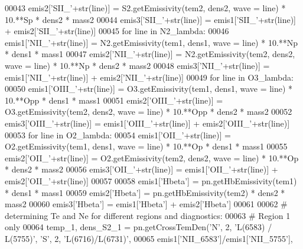 \begin{DoxyCode}
00043     emis2[\textcolor{stringliteral}{'SII\_'}+str(line)] = S2.getEmissivity(tem2, dens2, wave = line) * 10.**Sp * dens2 * mass2
00044     emis3[\textcolor{stringliteral}{'SII\_'}+str(line)] = emis1[\textcolor{stringliteral}{'SII\_'}+str(line)] + emis2[\textcolor{stringliteral}{'SII\_'}+str(line)]
00045 \textcolor{keywordflow}{for} line \textcolor{keywordflow}{in} N2\_lambda:
00046     emis1[\textcolor{stringliteral}{'NII\_'}+str(line)] = N2.getEmissivity(tem1, dens1, wave = line) * 10.**Np * dens1 * mass1
00047     emis2[\textcolor{stringliteral}{'NII\_'}+str(line)] = N2.getEmissivity(tem2, dens2, wave = line) * 10.**Np * dens2 * mass2
00048     emis3[\textcolor{stringliteral}{'NII\_'}+str(line)] = emis1[\textcolor{stringliteral}{'NII\_'}+str(line)] + emis2[\textcolor{stringliteral}{'NII\_'}+str(line)]
00049 \textcolor{keywordflow}{for} line \textcolor{keywordflow}{in} O3\_lambda:
00050     emis1[\textcolor{stringliteral}{'OIII\_'}+str(line)] = O3.getEmissivity(tem1, dens1, wave = line) * 10.**Opp * dens1 * mass1
00051     emis2[\textcolor{stringliteral}{'OIII\_'}+str(line)] = O3.getEmissivity(tem2, dens2, wave = line) * 10.**Opp * dens2 * mass2
00052     emis3[\textcolor{stringliteral}{'OIII\_'}+str(line)] = emis1[\textcolor{stringliteral}{'OIII\_'}+str(line)] + emis2[\textcolor{stringliteral}{'OIII\_'}+str(line)]
00053 \textcolor{keywordflow}{for} line \textcolor{keywordflow}{in} O2\_lambda:
00054     emis1[\textcolor{stringliteral}{'OII\_'}+str(line)] = O2.getEmissivity(tem1, dens1, wave = line) * 10.**Op * dens1 * mass1
00055     emis2[\textcolor{stringliteral}{'OII\_'}+str(line)] = O2.getEmissivity(tem2, dens2, wave = line) * 10.**Op * dens2 * mass2
00056     emis3[\textcolor{stringliteral}{'OII\_'}+str(line)] = emis1[\textcolor{stringliteral}{'OII\_'}+str(line)] + emis2[\textcolor{stringliteral}{'OII\_'}+str(line)]
00057         
00058 emis1[\textcolor{stringliteral}{'Hbeta'}] = pn.getHbEmissivity(tem1) * dens1 * mass1
00059 emis2[\textcolor{stringliteral}{'Hbeta'}] = pn.getHbEmissivity(tem2) * dens2 * mass2
00060 emis3[\textcolor{stringliteral}{'Hbeta'}] = emis1[\textcolor{stringliteral}{'Hbeta'}] + emis2[\textcolor{stringliteral}{'Hbeta'}] 
00061 
00062 \textcolor{comment}{# determining Te and Ne for different regions and diagnostics:}
00063 \textcolor{comment}{# Region 1 only}
00064 temp\_1, dens\_S2\_1 = pn.getCrossTemDen(\textcolor{stringliteral}{'N'}, 2, \textcolor{stringliteral}{'L(6583) / L(5755)'}, \textcolor{stringliteral}{'S'}, 2, \textcolor{stringliteral}{'L(6716)/L(6731)'}, 
00065                                       emis1[\textcolor{stringliteral}{'NII\_6583'}]/emis1[\textcolor{stringliteral}{'NII\_5755'}], 

\end{DoxyCode}
